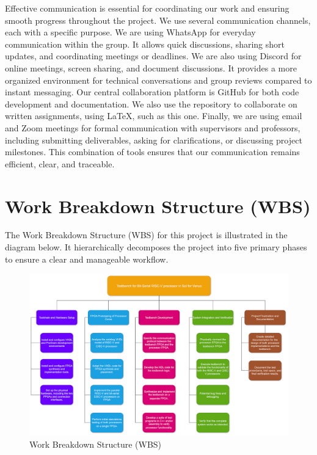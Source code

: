 \documentclass[10pt]{article}
\begin{document}
Effective communication is essential for coordinating our work and ensuring smooth progress throughout the project. We use several communication channels, each with a specific purpose.  
We are using WhatsApp for everyday communication within the group. It allows quick discussions, sharing short updates, and coordinating meetings or deadlines.  
We are also using Discord for online meetings, screen sharing, and document discussions. It provides a more organized environment for technical conversations and group reviews compared to instant messaging.  
Our central collaboration platform is GitHub for both code development and documentation. We also use the repository to collaborate on written assignments, using LaTeX, such as this one.  
Finally, we are using email and Zoom meetings for formal communication with supervisors and professors, including submitting deliverables, asking for clarifications, or discussing project milestones.  
This combination of tools ensures that our communication remains efficient, clear, and traceable.

\FloatBarrier
\section{Work Breakdown Structure (WBS)}

The Work Breakdown Structure (WBS) for this project is illustrated in the diagram below. It hierarchically decomposes the project into five primary phases to ensure a clear and manageable workflow.\\

\begin{figure}[H]
\centering
\includegraphics[width=\linewidth]{WBS.png}
\caption{Work Breakdown Structure (WBS)}
\label{fig:timeline}
\end{figure}
\end{document}
